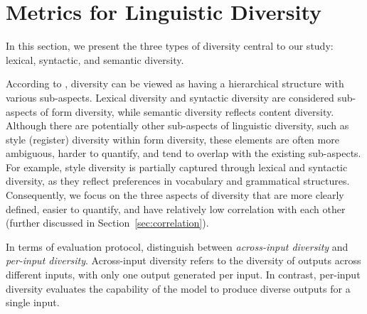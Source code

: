 \documentclass[11pt,a4paper]{article}
\begin{document}
\section{Metrics for Linguistic Diversity}\label{sec:diversity}

In this section, we present the three types of diversity central to our study: lexical, syntactic, and semantic diversity. %

According to \citet{tevet-berant-2021-evaluating}, diversity can be viewed as having a hierarchical structure with various sub-aspects.
Lexical diversity and syntactic diversity are considered sub-aspects of form diversity, while semantic diversity reflects content diversity. 
Although there are potentially other sub-aspects of linguistic diversity, such as style (register) diversity within form diversity, these elements are often more ambiguous, harder to quantify, and tend to overlap with the existing sub-aspects. 
For example, style diversity is partially captured through lexical and syntactic diversity, as they reflect preferences in vocabulary and grammatical structures. Consequently, we focus on the three aspects of diversity that are more clearly defined, easier to quantify, and have relatively low correlation with each other (further discussed in Section~\ref{sec:correlation}).



In terms of evaluation protocol, \citet{kirk2024understanding} distinguish between \textit{across-input diversity} and \textit{per-input diversity}. 
Across-input diversity refers to the diversity of outputs across different inputs, with only one output generated per input. In contrast, per-input diversity evaluates the capability of the model to produce diverse outputs for a single input.
\end{document}

